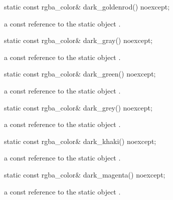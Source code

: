 \begin{itemdecl}
static const rgba_color& dark_goldenrod() noexcept;
\end{itemdecl}
\begin{itemdescr}
\pnum
\returns
a const reference to the static  object .
\end{itemdescr}

\begin{itemdecl}
static const rgba_color& dark_gray() noexcept;
\end{itemdecl}
\begin{itemdescr}
\pnum
\returns
a const reference to the static  object .
\end{itemdescr}

\begin{itemdecl}
static const rgba_color& dark_green() noexcept;
\end{itemdecl}
\begin{itemdescr}
\pnum
\returns
a const reference to the static  object .
\end{itemdescr}

\begin{itemdecl}
static const rgba_color& dark_grey() noexcept;
\end{itemdecl}
\begin{itemdescr}
\pnum
\returns
a const reference to the static  object .
\end{itemdescr}

\begin{itemdecl}
static const rgba_color& dark_khaki() noexcept;
\end{itemdecl}
\begin{itemdescr}
\pnum
\returns
a const reference to the static  object .
\end{itemdescr}

\begin{itemdecl}
static const rgba_color& dark_magenta() noexcept;
\end{itemdecl}
\begin{itemdescr}
\pnum
\returns
a const reference to the static  object .
\end{itemdescr}

